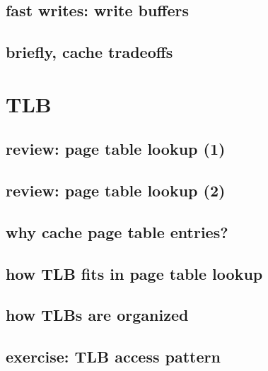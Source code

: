 \subsection{fast writes: write buffers}


\subsection{briefly, cache tradeoffs}


\section{TLB}

\subsection{review: page table lookup (1)}


\subsection{review: page table lookup (2)}

\subsection{why cache page table entries?}


\subsection{how TLB fits in page table lookup}


\subsection{how TLBs are organized}

\subsection{exercise: TLB access pattern}



